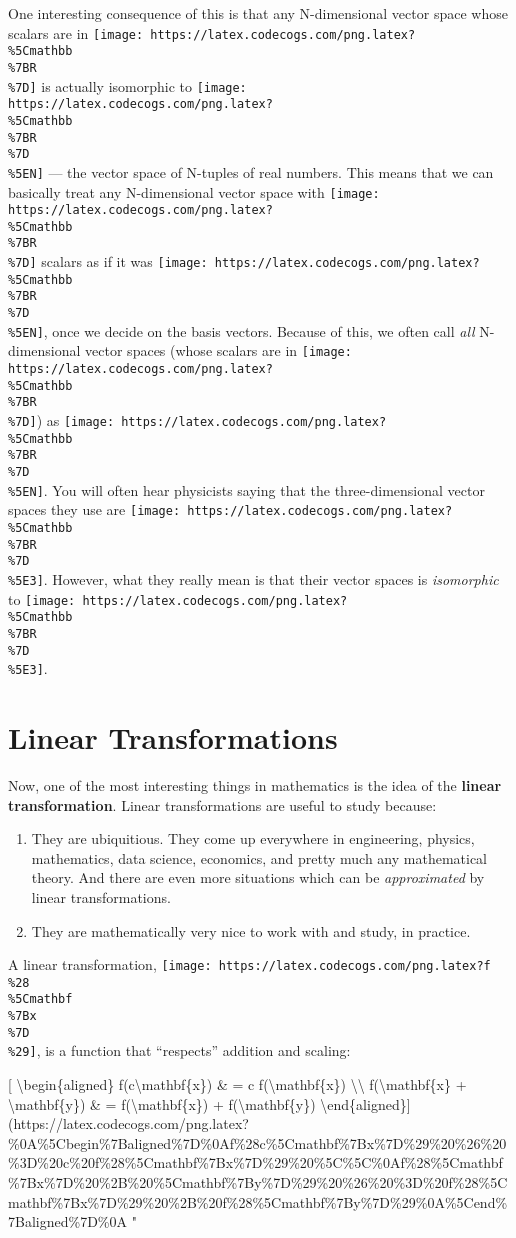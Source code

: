 \documentclass[]{article}
\begin{document}
One interesting consequence of this is that any N-dimensional vector space whose
scalars are in
\texttt{[image: https://latex.codecogs.com/png.latex?\\\%5Cmathbb\\\%7BR\\\%7D]} is
actually isomorphic to
\texttt{[image: https://latex.codecogs.com/png.latex?\\\%5Cmathbb\\\%7BR\\\%7D\\\%5EN]}
--- the vector space of N-tuples of real numbers. This means that we can
basically treat any N-dimensional vector space with
\texttt{[image: https://latex.codecogs.com/png.latex?\\\%5Cmathbb\\\%7BR\\\%7D]}
scalars as if it was
\texttt{[image: https://latex.codecogs.com/png.latex?\\\%5Cmathbb\\\%7BR\\\%7D\\\%5EN]},
once we decide on the basis vectors. Because of this, we often call \emph{all}
N-dimensional vector spaces (whose scalars are in
\texttt{[image: https://latex.codecogs.com/png.latex?\\\%5Cmathbb\\\%7BR\\\%7D]}) as
\texttt{[image: https://latex.codecogs.com/png.latex?\\\%5Cmathbb\\\%7BR\\\%7D\\\%5EN]}.
You will often hear physicists saying that the three-dimensional vector spaces
they use are
\texttt{[image: https://latex.codecogs.com/png.latex?\\\%5Cmathbb\\\%7BR\\\%7D\\\%5E3]}.
However, what they really mean is that their vector spaces is \emph{isomorphic}
to
\texttt{[image: https://latex.codecogs.com/png.latex?\\\%5Cmathbb\\\%7BR\\\%7D\\\%5E3]}.

\hypertarget{linear-transformations}{%
\section{Linear Transformations}\label{linear-transformations}}

Now, one of the most interesting things in mathematics is the idea of the
\textbf{linear transformation}. Linear transformations are useful to study
because:

\begin{enumerate}
\def\labelenumi{\arabic{enumi}.}
\tightlist
\item
  They are ubiquitious. They come up everywhere in engineering, physics,
  mathematics, data science, economics, and pretty much any mathematical theory.
  And there are even more situations which can be \emph{approximated} by linear
  transformations.
\item
  They are mathematically very nice to work with and study, in practice.
\end{enumerate}

A linear transformation,
\texttt{[image: https://latex.codecogs.com/png.latex?f\\\%28\\\%5Cmathbf\\\%7Bx\\\%7D\\\%29]},
is a function that ``respects'' addition and scaling:

{[} \textbackslash{}begin\{aligned\} f(c\textbackslash{}mathbf\{x\}) \& = c
f(\textbackslash{}mathbf\{x\}) \textbackslash{}\textbackslash{}
f(\textbackslash{}mathbf\{x\} + \textbackslash{}mathbf\{y\}) \& =
f(\textbackslash{}mathbf\{x\}) + f(\textbackslash{}mathbf\{y\})
\textbackslash{}end\{aligned\}{]}(https://latex.codecogs.com/png.latex?\%0A\%5Cbegin\%7Baligned\%7D\%0Af\%28c\%5Cmathbf\%7Bx\%7D\%29\%20\%26\%20\%3D\%20c\%20f\%28\%5Cmathbf\%7Bx\%7D\%29\%20\%5C\%5C\%0Af\%28\%5Cmathbf\%7Bx\%7D\%20\%2B\%20\%5Cmathbf\%7By\%7D\%29\%20\%26\%20\%3D\%20f\%28\%5Cmathbf\%7Bx\%7D\%29\%20\%2B\%20f\%28\%5Cmathbf\%7By\%7D\%29\%0A\%5Cend\%7Baligned\%7D\%0A
"
\end{document}
